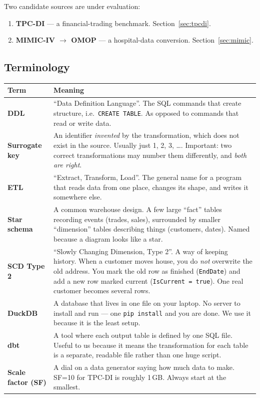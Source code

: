 \documentclass[11pt,a4paper]{article}
\newcommand{\code}[1]{\texttt{\small #1}}
\begin{document}
Two candidate sources are under evaluation:

\begin{enumerate}
\item \textbf{TPC-DI} --- a financial-trading benchmark. Section~\ref{sec:tpcdi}.
\item \textbf{MIMIC-IV $\rightarrow$ OMOP} --- a hospital-data conversion. Section~\ref{sec:mimic}.
\end{enumerate}

\subsection{Terminology}

\begin{center}
\small
\begin{longtable}{@{}L{3.3cm}L{12.4cm}@{}}
\toprule
\textbf{Term} & \textbf{Meaning} \\
\midrule
\endhead
\textbf{DDL} & ``Data Definition Language''. The SQL commands that create structure, i.e.\ \code{CREATE TABLE}. As opposed to commands that read or write data. \\
\textbf{Surrogate key} & An identifier \emph{invented} by the transformation, which does not exist in the source. Usually just 1, 2, 3, \ldots. Important: two correct transformations may number them differently, and \emph{both are right}. \\
\textbf{ETL} & ``Extract, Transform, Load''. The general name for a program that reads data from one place, changes its shape, and writes it somewhere else. \\
\textbf{Star schema} & A common warehouse design. A few large ``fact'' tables recording events (trades, sales), surrounded by smaller ``dimension'' tables describing things (customers, dates). Named because a diagram looks like a star. \\
\textbf{SCD Type 2} & ``Slowly Changing Dimension, Type 2''. A way of keeping history. When a customer moves house, you do \emph{not} overwrite the old address. You mark the old row as finished (\code{EndDate}) and add a new row marked current (\code{IsCurrent = true}). One real customer becomes several rows. \\
\textbf{DuckDB} & A database that lives in one file on your laptop. No server to install and run --- one \code{pip install} and you are done. We use it because it is the least setup. \\
\textbf{dbt} & A tool where each output table is defined by one SQL file. Useful to us because it means the transformation for each table is a separate, readable file rather than one huge script. \\
\textbf{Scale factor (SF)} & A dial on a data generator saying how much data to make. SF=10 for TPC-DI is roughly 1\,GB. Always start at the smallest. \\
\bottomrule
\end{longtable}
\end{center}
\end{document}
